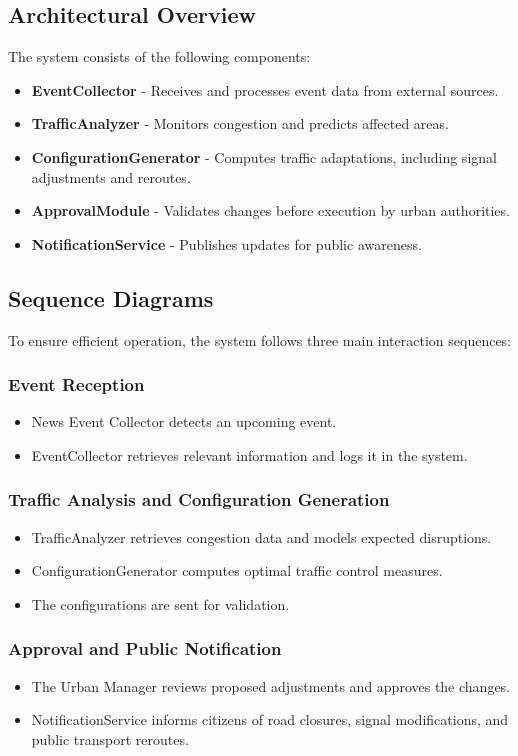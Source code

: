 \documentclass[a4paper,12pt]{article}
\begin{document}
\subsection{Architectural Overview}
The system consists of the following components:
\begin{itemize}
    \item \textbf{EventCollector} - Receives and processes event data from external sources.
    \item \textbf{TrafficAnalyzer} - Monitors congestion and predicts affected areas.
    \item \textbf{ConfigurationGenerator} - Computes traffic adaptations, including signal adjustments and reroutes.
    \item \textbf{ApprovalModule} - Validates changes before execution by urban authorities.
    \item \textbf{NotificationService} - Publishes updates for public awareness.
\end{itemize}

\subsection{Sequence Diagrams}
To ensure efficient operation, the system follows three main interaction sequences:

\subsubsection{Event Reception}
\begin{itemize}
    \item News Event Collector detects an upcoming event.
    \item EventCollector retrieves relevant information and logs it in the system.
\end{itemize}

\subsubsection{Traffic Analysis and Configuration Generation}
\begin{itemize}
    \item TrafficAnalyzer retrieves congestion data and models expected disruptions.
    \item ConfigurationGenerator computes optimal traffic control measures.
    \item The configurations are sent for validation.
\end{itemize}

\subsubsection{Approval and Public Notification}
\begin{itemize}
    \item The Urban Manager reviews proposed adjustments and approves the changes.
    \item NotificationService informs citizens of road closures, signal modifications, and public transport reroutes.
\end{itemize}
\end{document}
